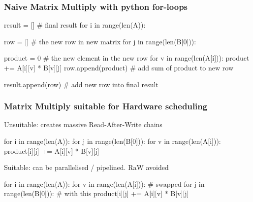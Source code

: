 \documentclass[slidestop]{beamer}
\begin{document}
\begin{frame}[fragile]
\frametitle{Naive Matrix Multiply with python for-loops}

\begin{semiverbatim}
result = [] # final result
for i in range(len(A)):

  row = [] # the new row in new matrix
  for j in range(len(B[0])):

    product = 0 # the new element in the new row
    for v in range(len(A[i])):
        product += A[i][v] * B[v][j]
    row.append(product) # add sum of product to new row

  result.append(row) # add new row into final result
\end{semiverbatim}

\end{frame}

\begin{frame}[fragile]
\frametitle{Matrix Multiply suitable for Hardware scheduling}

\begin{semiverbatim}
Unsuitable: creates massive Read-After-Write chains

for i in range(len(A)):
  for j in range(len(B[0])):
    for v in range(len(A[i])):
      product[i][j] += A[i][v] * B[v][j]

Suitable: can be parallelised / pipelined. RaW avoided

for i in range(len(A)):
  for v in range(len(A[i])):    # swapped
    for j in range(len(B[0])):  # with this
      product[i][j] += A[i][v] * B[v][j]

\end{semiverbatim}

\end{frame}


\end{document}

